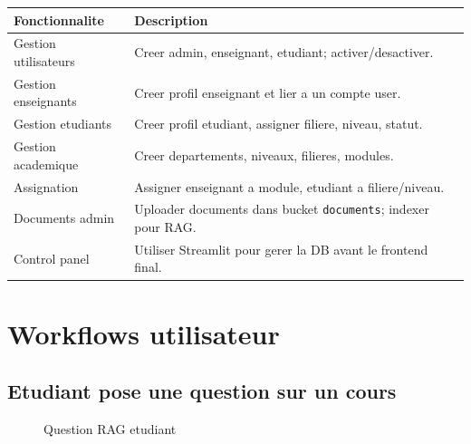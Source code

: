 \documentclass[11pt,a4paper]{article}
\begin{document}
\begin{longtable}{p{5cm}p{9cm}}
\toprule
\textbf{Fonctionnalite} & \textbf{Description}\\
\midrule
Gestion utilisateurs & Creer admin, enseignant, etudiant; activer/desactiver.\\
Gestion enseignants & Creer profil enseignant et lier a un compte user.\\
Gestion etudiants & Creer profil etudiant, assigner filiere, niveau, statut.\\
Gestion academique & Creer departements, niveaux, filieres, modules.\\
Assignation & Assigner enseignant a module, etudiant a filiere/niveau.\\
Documents admin & Uploader documents dans bucket \texttt{documents}; indexer pour RAG.\\
Control panel & Utiliser Streamlit pour gerer la DB avant le frontend final.\\
\bottomrule
\end{longtable}

\section{Workflows utilisateur}

\subsection{Etudiant pose une question sur un cours}

\begin{figure}[H]
\centering
{}
\caption{Question RAG etudiant}
\end{figure}
\end{document}
